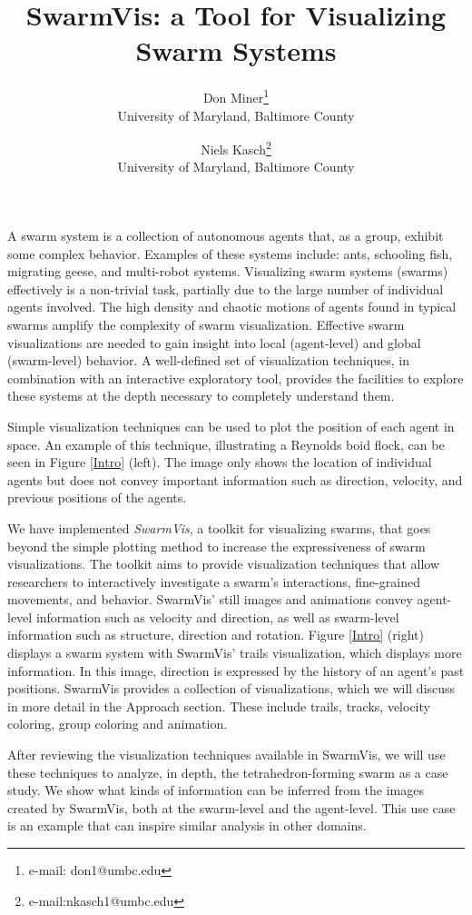 \documentclass{vgtc}
\title{SwarmVis: a Tool for Visualizing Swarm Systems}
\author{Don Miner\thanks{e-mail: don1@umbc.edu}\\ %
        \scriptsize University of Maryland, Baltimore County %
\and Niels Kasch\thanks{e-mail:nkasch1@umbc.edu}\\ %
     \scriptsize University of Maryland, Baltimore County %
}
\begin{document}

\maketitle

A swarm system is a collection of autonomous agents that, as a group, exhibit some complex behavior.
Examples of these systems include: ants\cite{couzin2003sol}, schooling fish\cite{parrish2002sof}, migrating geese\cite{reynolds1987}, 
and multi-robot systems\cite{mondada2004sbn}\cite{mclurkin2004srt}.
Visualizing swarm systems (swarms) effectively is a non-trivial task, partially due to the large number of individual agents involved.
The high density and chaotic motions of agents found in typical swarms amplify the complexity of swarm visualization.
Effective swarm visualizations are needed to gain insight into local (agent-level) and global (swarm-level) behavior.
A well-defined set of visualization techniques, in combination with an interactive exploratory tool,
provides the facilities to explore these systems at the depth necessary to completely understand them.


Simple visualization techniques can be used to plot the position of each agent in space.
An example of this technique, illustrating a Reynolds boid flock\cite{reynolds1987}, can be seen in Figure \ref{Intro} (left).
The image only shows the location of individual agents but does not convey important
information such as direction, velocity, and previous positions of the agents.

We have implemented \textit{SwarmVis}, a toolkit for visualizing swarms,
that goes beyond the simple plotting method to increase the
expressiveness of swarm visualizations.
The toolkit aims to provide visualization techniques that allow researchers to interactively
investigate a swarm's interactions, fine-grained movements, and behavior.
SwarmVis' still images and animations convey agent-level information such as velocity and direction, as well as swarm-level information such as
structure, direction and rotation.
Figure \ref{Intro} (right) displays a swarm system with SwarmVis' trails visualization, which displays more information.
In this image, direction is expressed by the history of an agent's past positions.
SwarmVis provides a collection of visualizations, which we will discuss in more detail in the Approach section. These include
trails, tracks, velocity coloring, group coloring and animation.

After reviewing the visualization techniques available in SwarmVis, we will use these techniques to analyze, in depth,
the tetrahedron-forming swarm as a case study. We show what kinds of information can be inferred from the images created by SwarmVis,
both at the swarm-level and the agent-level. This use case is an example that can inspire similar analysis in other domains.
\end{document}
